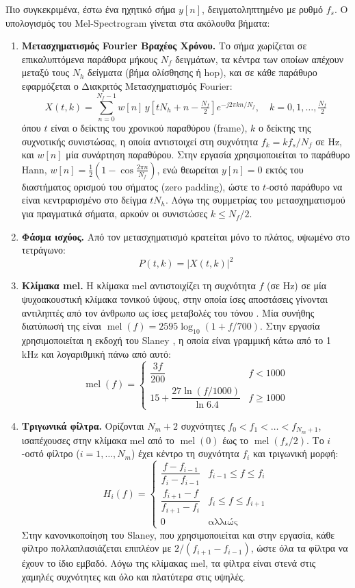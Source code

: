 Πιο συγκεκριμένα, έστω ένα ηχητικό σήμα $y[n]$, δειγματοληπτημένο με ρυθμό $f_s$. Ο υπολογισμός του Mel-Spectrogram γίνεται στα ακόλουθα βήματα:

\begin{enumerate}
\item \textbf{Μετασχηματισμός Fourier Βραχέος Χρόνου.} Το σήμα χωρίζεται σε επικαλυπτόμενα παράθυρα μήκους $N_f$ δειγμάτων, τα κέντρα των οποίων απέχουν μεταξύ τους $N_h$ δείγματα (βήμα ολίσθησης ή hop), και σε κάθε παράθυρο εφαρμόζεται ο Διακριτός Μετασχηματισμός Fourier:
\[
X(t,k) = \sum_{n=0}^{N_f-1} w[n] \, y\!\left[t N_h + n - \tfrac{N_f}{2}\right] e^{-j 2\pi k n / N_f}, \quad k = 0, 1, \ldots, \tfrac{N_f}{2}
\]
όπου $t$ είναι ο δείκτης του χρονικού παραθύρου (frame), $k$ ο δείκτης της συχνοτικής συνιστώσας, η οποία αντιστοιχεί στη συχνότητα $f_k = k f_s / N_f$ σε Hz, και $w[n]$ μία συνάρτηση παραθύρου. Στην εργασία χρησιμοποιείται το παράθυρο Hann, $w[n] = \frac{1}{2}\left(1 - \cos\frac{2\pi n}{N_f}\right)$, ενώ θεωρείται $y[n] = 0$ εκτός του διαστήματος ορισμού του σήματος (zero padding), ώστε το $t$-οστό παράθυρο να είναι κεντραρισμένο στο δείγμα $t N_h$. Λόγω της συμμετρίας του μετασχηματισμού για πραγματικά σήματα, αρκούν οι συνιστώσες $k \leq N_f/2$.

\item \textbf{Φάσμα ισχύος.} Από τον μετασχηματισμό κρατείται μόνο το πλάτος, υψωμένο στο τετράγωνο:
\[
P(t,k) = \lvert X(t,k) \rvert^2
\]

\item \textbf{Κλίμακα mel.} Η κλίμακα mel αντιστοιχίζει τη συχνότητα $f$ (σε Hz) σε μία ψυχοακουστική κλίμακα τονικού ύψους, στην οποία ίσες αποστάσεις γίνονται αντιληπτές από τον άνθρωπο ως ίσες μεταβολές του τόνου \cite{Stevens1937}. Μία συνήθης διατύπωσή της είναι $\operatorname{mel}(f) = 2595 \log_{10}(1 + f/700)$. Στην εργασία χρησιμοποιείται η εκδοχή του Slaney \cite{Slaney1998}, η οποία είναι γραμμική κάτω από το 1 kHz και λογαριθμική πάνω από αυτό:
\[
\operatorname{mel}(f) = \begin{cases}
\dfrac{3f}{200} & f < 1000 \\[2mm]
15 + \dfrac{27 \ln(f/1000)}{\ln 6.4} & f \geq 1000
\end{cases}
\]

\item \textbf{Τριγωνικά φίλτρα.} Ορίζονται $N_m + 2$ συχνότητες $f_0 < f_1 < \ldots < f_{N_m+1}$, ισαπέχουσες στην κλίμακα mel από το $\operatorname{mel}(0)$ έως το $\operatorname{mel}(f_s/2)$. Το $i$-οστό φίλτρο ($i = 1, \ldots, N_m$) έχει κέντρο τη συχνότητα $f_i$ και τριγωνική μορφή:
\[
H_i(f) = \begin{cases}
\dfrac{f - f_{i-1}}{f_i - f_{i-1}} & f_{i-1} \leq f \leq f_i \\[2mm]
\dfrac{f_{i+1} - f}{f_{i+1} - f_i} & f_i \leq f \leq f_{i+1} \\[2mm]
0 & \text{αλλιώς}
\end{cases}
\]
Στην κανονικοποίηση του Slaney, που χρησιμοποιείται και στην εργασία, κάθε φίλτρο πολλαπλασιάζεται επιπλέον με $2/(f_{i+1} - f_{i-1})$, ώστε όλα τα φίλτρα να έχουν το ίδιο εμβαδό. Λόγω της κλίμακας mel, τα φίλτρα είναι στενά στις χαμηλές συχνότητες και όλο και πλατύτερα στις υψηλές.


\end{enumerate}

